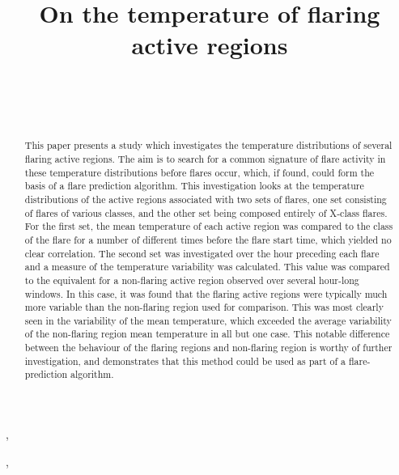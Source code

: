 \documentclass[namedreferences]{solarphysics}
\begin{document}
\begin{article}
\begin{opening}

\title{On the temperature of flaring active regions}

\author[addressref=aff1,corref,email={a.j.leonard@sheffield.ac.uk}]{~}\sep
\author[addressref=aff2]{~}\sep

\address[id=aff1]{Solar Physics \& Space Plasma Research Centre (SP$^{2}$RC), School of Mathematics and Statistics, The University of Sheffield, Hicks Building, Hounsfield Road, Sheffield, S3 7RH U.K.}
\address[id=aff2]{Institute of Mathematics, Physics and Computer Science, Prifysgol Aberystwyth, Ceredigion, Cymru SY23 3BZ, U.K.}


\begin{abstract}
This paper presents a study which investigates the temperature distributions of several flaring active regions.
The aim is to search for a common signature of flare activity in these temperature distributions before flares occur, which, if found, could form the basis of a flare prediction algorithm.
This investigation looks at the temperature distributions of the active regions associated with two sets of flares, one set consisting of flares of various classes, and the other set being composed entirely of X-class flares.
For the first set, the mean temperature of each active region was compared to the class of the flare for a number of different times before the flare start time, which yielded no clear correlation.
The second set was investigated over the hour preceding each flare and a measure of the temperature variability was calculated.
This value was compared to the equivalent for a non-flaring active region observed over several hour-long windows.
In this case, it was found that the flaring active regions were typically much more variable than the non-flaring region used for comparison.
This was most clearly seen in the variability of the mean temperature, which exceeded the average variability of the non-flaring region mean temperature in all but one case.
This notable difference between the behaviour of the flaring regions and non-flaring region is worthy of further investigation, and demonstrates that this method could be used as part of a flare-prediction algorithm.
\end{abstract}
\keywords{}
\end{opening}


\end{article}
\end{document}
